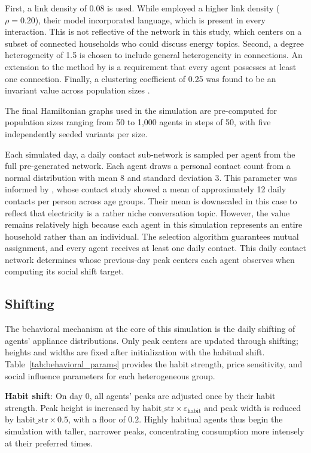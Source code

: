 \documentclass[11pt, a4paper]{article}
\begin{document}
First, a link density of 0.08 is used. While \textcite{reali_simpler_2018} employed a higher link density ($\rho = 0.20$), their model incorporated language, which is present in every interaction. This is not reflective of the network in this study, which centers on a subset of connected households who could discuss energy topics. Second, a degree heterogeneity of 1.5 is chosen to include general heterogeneity in connections. An extension to the method by \textcite{house_heterogeneous_2014} is a requirement that every agent possesses at least one connection. Finally, a clustering coefficient of 0.25 was found to be an invariant value across population sizes \autocite{schlapfer_scaling_2014}.

The final Hamiltonian graphs used in the simulation are pre-computed for population sizes ranging from 50 to 1,000 agents in steps of 50, with five independently seeded variants per size.

Each simulated day, a daily contact sub-network is sampled per agent from the full pre-generated network. Each agent draws a personal contact count from a normal distribution with mean 8 and standard deviation 3. This parameter was informed by \textcite{mousa_social_2021}, whose contact study showed a mean of approximately 12 daily contacts per person across age groups. Their mean is downscaled in this case to reflect that electricity is a rather niche conversation topic. However, the value remains relatively high because each agent in this simulation represents an entire household rather than an individual. The selection algorithm guarantees mutual assignment, and every agent receives at least one daily contact. This daily contact network determines whose previous-day peak centers each agent observes when computing its social shift target.

\subsection{Shifting} \label{subs:shifting}

The behavioral mechanism at the core of this simulation is the daily shifting of agents' appliance distributions. Only peak centers are updated through shifting; heights and widths are fixed after initialization with the habitual shift. Table~\ref{tab:behavioral_params} provides the habit strength, price sensitivity, and social influence parameters for each heterogeneous group.
\medskip

\textbf{Habit shift}: On day 0, all agents' peaks are adjusted once by their habit strength. Peak height is increased by $\text{habit\_str} \times \varepsilon_{\text{habit}}$ and peak width is reduced by $\text{habit\_str} \times 0.5$, with a floor of $0.2$. Highly habitual agents thus begin the simulation with taller, narrower peaks, concentrating consumption more intensely at their preferred times. 
\end{document}
